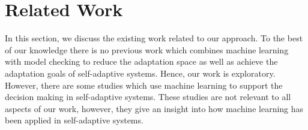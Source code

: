 \documentclass[a4paper,12pt]{article}
\begin{document}

\newpage
\section{Related Work} \label{RealtedWork}
In this section, we discuss the existing work related to our approach. To the best of our knowledge there is no previous work which combines machine learning with model checking to reduce the adaptation space as well as achieve the adaptation goals of self-adaptive systems. Hence, our work is exploratory. However, there are some studies which use machine learning to support the decision making in self-adaptive systems. These studies are not relevant to all aspects of our work, however, they give an insight into how machine learning has been applied in self-adaptive systems.
  
\end{document}
